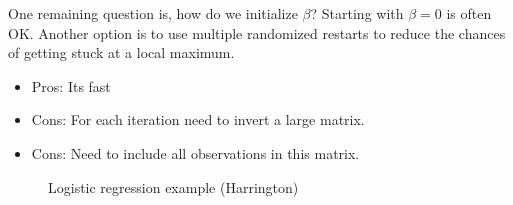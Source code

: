 \documentclass[a4paper]{article}
\begin{document}
One remaining question is, how do we initialize $\beta$? Starting with $\beta=0$ is often OK.  Another option is to use multiple randomized restarts to reduce the chances of getting stuck at a local maximum.

\begin{itemize}
\item Pros: Its fast
\end{itemize}



\begin{itemize}
\item Cons: For each iteration need to invert a large matrix.
\item Cons: Need to include all observations in this matrix.
\end{itemize}

\begin{figure}
\centering
{}
\quad
{}

\quad
\caption{Logistic regression example (Harrington)}
\label{fig:Harrington}
\end{figure}
\end{document}
